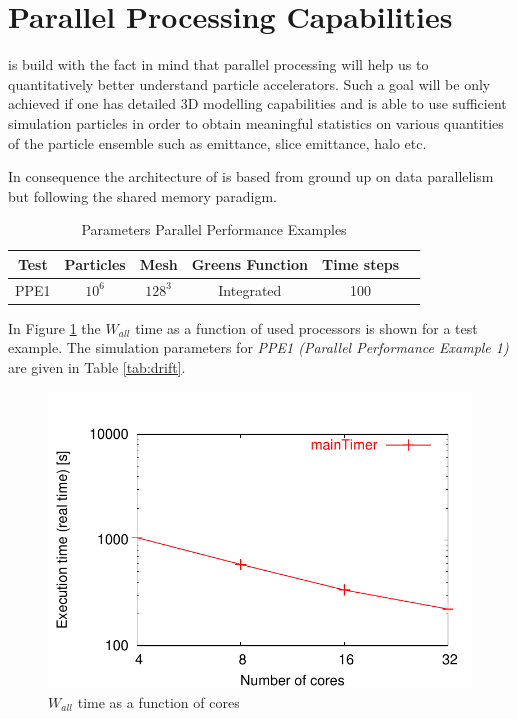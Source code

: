 \section{Parallel Processing Capabilities}
\opal is build with the fact in mind that parallel processing will help us to quantitatively better understand particle accelerators. Such a goal will be only achieved if one has
detailed 3D modelling capabilities and is able to use sufficient simulation particles in order to obtain meaningful  statistics on various quantities of the particle ensemble such as
emittance, slice emittance, halo etc. 

In consequence the architecture of \opal is based from ground up on data parallelism but  following the shared memory paradigm. 

\begin{table}[ht]
\caption{Parameters Parallel Performance Examples }
   \label{tab:drift}
\centering %
\begin{tabular}{c c c c c c} %
\hline\hline %
Test & Particles  & Mesh & Greens Function & Time steps  \\ [0.75ex] %
\hline %
PPE1 & $10^6$ & $128^3$ & Integrated  & 100 \\ [1ex] %
\hline %
\end{tabular}
\label{table:nonlin} %
\end{table}

In Figure \ref{fig:walldrift} the $W_{all}$ time as a function of used processors is shown for a test example. The simulation parameters for {\em PPE1 (Parallel Performance Example 1)}  are given in 
Table \ref{tab:drift}.
\begin{figure}[ht]
 \begin{center}
 \includegraphics[width=0.5\linewidth,angle=0]{figures/speedup/Drift/mainTimer}
  \caption{$W_{all}$ time as a function of cores}
  \label{fig:walldrift}
 \end{center}
\end{figure}

